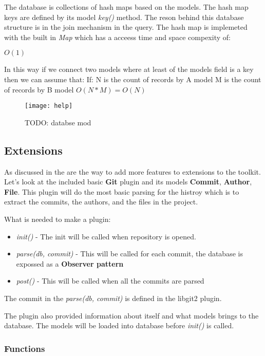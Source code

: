 The database is collections of hash maps based on the models. The hash map keys are defined by its model \textit{key()} method.
The reson behind this database structure is in the join mechanism in the query. The hash map is implemeted with the built in 
\textit{Map} \cite{map} which has a acceess time and space compexity of:

\( O(1) \)

In this way if we connect two models where at least of the models field is a key then we can assume that:\newline
If: N is the count of records by A model
	M  is the count of records by B model
\(O(N * M) = O(N)\)

\begin{figure}[H]
	\centering
	\texttt{[image: help]}
	\caption{TODO: databse mod}
	\label{fig:fig-help}
\end{figure}

\subsection{Extensions}

As discussed in the  are the way to add more features to extensions to the toolkit.
Let's look at the included basic \textbf{Git} plugin and its models \textbf{Commit}, \textbf{Author}, \textbf{File}.
This plugin will do the most basic parsing for the histroy which is to extract the commits, the authors, and the files
in the project.

What is needed to make a plugin:
\begin{itemize}
	\item \textit{init()} - The init will be called when repository is opened.
	\item \textit{parse(db, commit)} - This will be called for each commit, the database is expossed as a \textbf{Observer pattern}
	\item \textit{post()} - This will be called when all the commits are parsed
\end{itemize}

The commit in the \textit{parse(db, commit)} is defined in the libgit2 plugin.

The plugin also provided information about itself and what models brings to the database. 
The models will be loaded into database before \textit{init()} is called.

\subsubsection{Functions}

